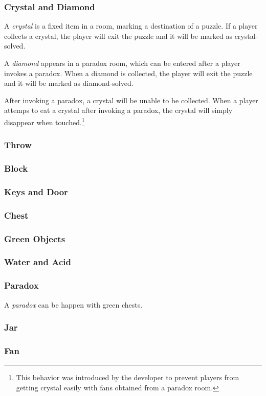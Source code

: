 \documentclass[a4paper]{article}
\theoremstyle{definition}
\begin{document}
\subsubsection{Crystal and Diamond}
A \emph{crystal} is a fixed item in a room, marking a destination of a puzzle. If a player
collects a crystal, the player will exit the puzzle and it will be marked as crystal-solved.

A \emph{diamond} appears in a paradox room, which can be entered after a player invokes a paradox.
When a diamond is collected, the player will exit the puzzle and it will be marked as diamond-solved.

After invoking a paradox, a crystal will be unable to be collected. When a player attemps to eat a crystal
after invoking a paradox, the crystal will simply disappear when touched.\footnote{This behavior was introduced
by the developer to prevent players from getting crystal easily with fans obtained from a paradox room.}
\subsubsection{Throw}
\subsubsection{Block}
\subsubsection{Keys and Door}
\subsubsection{Chest}
\subsubsection{Green Objects}
\subsubsection{Water and Acid}
\subsubsection{Paradox}
A \emph{paradox} can be happen with green chests.
\subsubsection{Jar}
\subsubsection{Fan}
\end{document}
